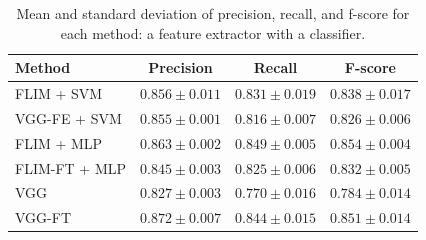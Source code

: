\documentclass[a4paper,conference]{IEEEtran}
\begin{document}
\begin{table}[!t]
  \begin{center}
  \begin{tabular}{|l|c|c|c|}
  \hline
   Method & Precision & Recall & F-score \\
  \hline\hline
    FLIM + SVM & $0.856 \pm 0.011 $ & $ 0.831 \pm 0.019$ & $ 0.838 \pm 0.017$\\ 
    VGG-FE + SVM & $0.855 \pm 0.001$ & $0.816 \pm 0.007$ & $0.826 \pm 0.006 $ \\\hline
      
    FLIM + MLP & $0.863 \pm 0.002$ & $0.849 \pm 0.005$ & $0.854 \pm 0.004$\\
    FLIM-FT + MLP & $0.845 \pm 0.003$ & $0.825\pm 0.006$ & $0.832 \pm 0.005$ \\

    VGG & $0.827 \pm 0.003$ & $0.770 \pm 0.016$  & $ 0.784 \pm 0.014$\\
    VGG-FT & $0.872 \pm 0.007$ & $0.844 \pm 0.015$ & $0.851 \pm 0.014 $ \\
   
  \hline
  \end{tabular}
  \end{center}

\caption{Mean and standard deviation of precision, recall, and f-score for each method: a feature extractor with a classifier.}
  \label{tab:results}
\end{table}
\end{document}
